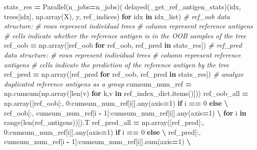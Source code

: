 \documentclass[
  11pt,
  oneside]{book}
\newenvironment{Shaded}{\begin{snugshade}}{\end{snugshade}}
\newcommand{\BuiltInTok}[1]{#1}
\newcommand{\CommentTok}[1]{\textcolor[rgb]{0.56,0.35,0.01}{\textit{#1}}}
\newcommand{\ControlFlowTok}[1]{\textcolor[rgb]{0.13,0.29,0.53}{\textbf{#1}}}
\newcommand{\DecValTok}[1]{\textcolor[rgb]{0.00,0.00,0.81}{#1}}
\newcommand{\KeywordTok}[1]{\textcolor[rgb]{0.13,0.29,0.53}{\textbf{#1}}}
\newcommand{\NormalTok}[1]{#1}
\newcommand{\OperatorTok}[1]{\textcolor[rgb]{0.81,0.36,0.00}{\textbf{#1}}}
\begin{document}
\begin{Shaded}
\begin{Highlighting}[]
\NormalTok{        stats\_res }\OperatorTok{=}\NormalTok{ Parallel(n\_jobs}\OperatorTok{=}\NormalTok{n\_jobs)(}
\NormalTok{                    delayed(\_get\_ref\_antigen\_stats)(idx, trees[idx], np.array(X), y, ref\_indices) }\ControlFlowTok{for}\NormalTok{ idx }\KeywordTok{in}\NormalTok{ idx\_list)}
        \CommentTok{\# ref\_oob data structure:}
        \CommentTok{\# rows represent individual trees}
        \CommentTok{\# column represent reference antigens}
        \CommentTok{\# cells indicate whether the reference antigen is in the OOB samples of the tree}
\NormalTok{        ref\_oob }\OperatorTok{=}\NormalTok{ np.array([ref\_oob }\ControlFlowTok{for}\NormalTok{ ref\_oob, ref\_pred }\KeywordTok{in}\NormalTok{ stats\_res])}
        \CommentTok{\# ref\_pred data structure:}
        \CommentTok{\# rows represent individual trees}
        \CommentTok{\# column represent reference antigens}
        \CommentTok{\# cells indicate the prediction of the reference antigen by the tree}
\NormalTok{        ref\_pred }\OperatorTok{=}\NormalTok{ np.array([ref\_pred }\ControlFlowTok{for}\NormalTok{ ref\_oob, ref\_pred }\KeywordTok{in}\NormalTok{ stats\_res])}
        \CommentTok{\# analyze duplicated reference antigens as a group}
\NormalTok{        cumsum\_num\_ref }\OperatorTok{=}\NormalTok{ np.cumsum(np.array([}\BuiltInTok{len}\NormalTok{(v) }\ControlFlowTok{for}\NormalTok{ k,v }\KeywordTok{in}\NormalTok{ ref\_index\_dict.items()]))}
\NormalTok{        ref\_oob\_all }\OperatorTok{=}\NormalTok{ np.array([ref\_oob[:, }\DecValTok{0}\NormalTok{:cumsum\_num\_ref[i]].}\BuiltInTok{any}\NormalTok{(axis}\OperatorTok{=}\DecValTok{1}\NormalTok{) }\ControlFlowTok{if}\NormalTok{ i }\OperatorTok{==} \DecValTok{0} \ControlFlowTok{else} \OperatorTok{\textbackslash{}}
\NormalTok{                                ref\_oob[:, cumsum\_num\_ref[i }\OperatorTok{{-}} \DecValTok{1}\NormalTok{]:cumsum\_num\_ref[i]].}\BuiltInTok{any}\NormalTok{(axis}\OperatorTok{=}\DecValTok{1}\NormalTok{) }\OperatorTok{\textbackslash{}}
                                \ControlFlowTok{for}\NormalTok{ i }\KeywordTok{in} \BuiltInTok{range}\NormalTok{(}\BuiltInTok{len}\NormalTok{(ref\_antigens))]).T}
\NormalTok{        ref\_pred\_all }\OperatorTok{=}\NormalTok{ np.array([ref\_pred[:, }\DecValTok{0}\NormalTok{:cumsum\_num\_ref[i]].}\BuiltInTok{any}\NormalTok{(axis}\OperatorTok{=}\DecValTok{1}\NormalTok{) }\ControlFlowTok{if}\NormalTok{ i }\OperatorTok{==} \DecValTok{0} \ControlFlowTok{else} \OperatorTok{\textbackslash{}}
\NormalTok{                                 ref\_pred[:, cumsum\_num\_ref[i }\OperatorTok{{-}} \DecValTok{1}\NormalTok{]:cumsum\_num\_ref[i]].}\BuiltInTok{sum}\NormalTok{(axis}\OperatorTok{=}\DecValTok{1}\NormalTok{) }\OperatorTok{\textbackslash{}}

\end{Highlighting}
\end{Shaded}
\end{document}
